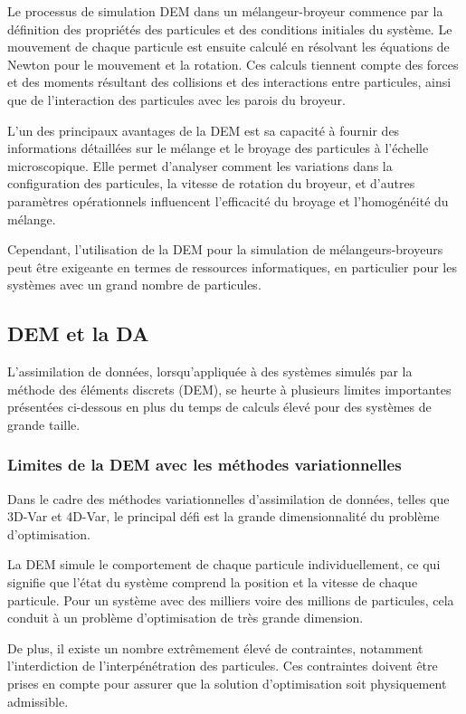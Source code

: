 Le processus de simulation DEM dans un mélangeur-broyeur commence par la définition des propriétés des particules et des conditions initiales du système. Le mouvement de chaque particule est ensuite calculé en résolvant les équations de Newton pour le mouvement et la rotation. Ces calculs tiennent compte des forces et des moments résultant des collisions et des interactions entre particules, ainsi que de l'interaction des particules avec les parois du broyeur.

L'un des principaux avantages de la DEM est sa capacité à fournir des informations détaillées sur le mélange et le broyage des particules à l'échelle microscopique. Elle permet d'analyser comment les variations dans la configuration des particules, la vitesse de rotation du broyeur, et d'autres paramètres opérationnels influencent l'efficacité du broyage et l'homogénéité du mélange.

Cependant, l'utilisation de la DEM pour la simulation de mélangeurs-broyeurs peut être exigeante en termes de ressources informatiques, en particulier pour les systèmes avec un grand nombre de particules.


\subsection{DEM et la DA}

L'assimilation de données, lorsqu'appliquée à des systèmes simulés par la méthode des éléments discrets (DEM), se heurte à plusieurs limites importantes présentées ci-dessous en plus du temps de calculs élevé pour des systèmes de grande taille.

\subsubsection{Limites de la DEM avec les méthodes variationnelles}

Dans le cadre des méthodes variationnelles d'assimilation de données, telles que 3D-Var et 4D-Var, le principal défi est la grande dimensionnalité du problème d'optimisation.

La DEM simule le comportement de chaque particule individuellement, ce qui signifie que l'état du système comprend la position et la vitesse de chaque particule. Pour un système avec des milliers voire des millions de particules, cela conduit à un problème d'optimisation de très grande dimension.

De plus, il existe un nombre extrêmement élevé de contraintes, notamment l'interdiction de l'interpénétration des particules. Ces contraintes doivent être prises en compte pour assurer que la solution d'optimisation soit physiquement admissible.

